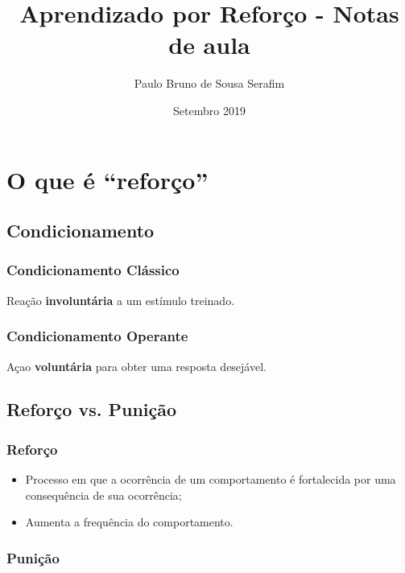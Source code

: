 \documentclass{article}
\title{Aprendizado por Reforço - Notas de aula}
\author{Paulo Bruno de Sousa Serafim}
\date{Setembro 2019}
\begin{document}
\maketitle

\section{O que é ``reforço''}

    \subsection{Condicionamento}
    
        \subsubsection{Condicionamento Clássico}
        
            Reação \textbf{involuntária} a um estímulo treinado.
        
        \subsubsection{Condicionamento Operante}
        
            Açao \textbf{voluntária} para obter uma resposta desejável.
        
    \subsection{Reforço vs. Punição}
    
        \subsubsection{Reforço}
        
            \begin{itemize}
                \item Processo em que a ocorrência de um comportamento é fortalecida por uma consequência de sua ocorrência;
                \item Aumenta a frequência do comportamento.
            \end{itemize}
        
        \subsubsection{Punição}
        
\end{document}
